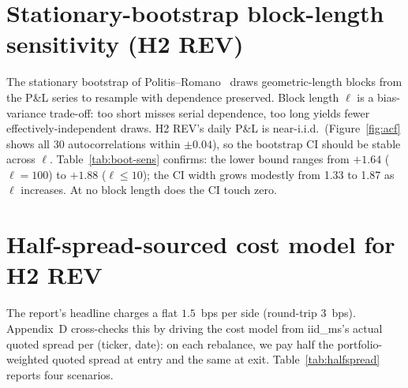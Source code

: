 \documentclass[10pt,conference,compsoc]{IEEEtran}
\begin{document}
\begin{table}[ht]
\centering
\caption{Newey--West-corrected $t$-statistic on H6 MOM across lag
choices. $q{=}0$ is the naive SE estimate. Bonferroni threshold
$t^{*} \approx 2.87$.}
\label{tab:nw-sens}
\small

\end{table}

\section{Stationary-bootstrap block-length sensitivity (H2 REV)}
\label{app:boot}

The stationary bootstrap of Politis--Romano~\cite{pr1994} draws
geometric-length blocks from the P\&L series to resample with
dependence preserved. Block length $\ell$ is a bias-variance
trade-off: too short misses serial dependence, too long yields
fewer effectively-independent draws. H2 REV's daily P\&L is
near-i.i.d.\ (Figure~\ref{fig:acf} shows all 30 autocorrelations
within $\pm 0.04$), so the bootstrap CI should be stable across
$\ell$. Table~\ref{tab:boot-sens} confirms: the lower bound
ranges from $+1.64$ ($\ell{=}100$) to $+1.88$ ($\ell \leq 10$);
the CI width grows modestly from 1.33 to 1.87 as $\ell$ increases.
At no block length does the CI touch zero.

\begin{table}[ht]
\centering
\caption{Bootstrap 95\% CI for annualised Sharpe of H2 REV at
several block lengths. Point estimate $+2.53$; $B = 2{,}000$
replicates, $N = 2{,}431$ daily observations.}
\label{tab:boot-sens}
\small

\end{table}

\section{Half-spread-sourced cost model for H2 REV}
\label{app:halfspread}

The report's headline charges a flat $1.5$~bps per side
(round-trip $3$~bps). Appendix~D cross-checks this by driving the
cost model from iid\_ms's actual quoted spread per (ticker, date):
on each rebalance, we pay half the portfolio-weighted quoted spread
at entry and the same at exit. Table~\ref{tab:halfspread} reports
four scenarios.

\begin{table}[ht]
\centering
\caption{H2 REV under four cost models. ``Avg.\ cost'' is the
portfolio's realised round-trip cost per day in basis points.
Half-spread is the $|w|$-weighted mean of iid\_ms
\texttt{QuotedSpread\_Percent\_tw} across the day's traded names.}
\label{tab:halfspread}
\scriptsize

\end{table}
\end{document}
